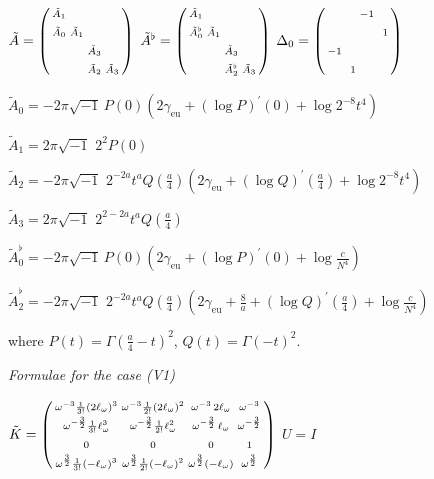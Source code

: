 \documentclass[a4paper,12pt,leqno]{amsart}
\numberwithin{equation}{section}
\theoremstyle{plain}
\theoremstyle{definition}
\newcommand{\De}{\Delta}
\newcommand{\om}{\omega}
\newcommand{\Ga}{\Gamma}
\newcommand{\no}{\noindent}
\newcommand{\pr}{\prime}
\newcommand{\bsp}{\left(\begin{smallmatrix}}
\newcommand{\esp}{\end{smallmatrix}\right)}
\newcommand{\ii}{ {\scriptstyle\sqrt{-1}}\, }
\newcommand{\eo}{\ell_\om}
\newcommand{\euler}{\gamma_{\scriptscriptstyle\text{eu}}}
\begin{document}
{$
\tilde A=
\bsp
\vphantom\sph
\tilde A_1 & & & 
\\
\vphantom\sph
\tilde A_0 & \tilde A_1 & & 
\\
\vphantom\sph
 & & \tilde A_3  & 
 \\
 \vphantom\sph
 & & \tilde A_2  & \tilde A_3
\esp
$
\quad
$
\tilde A^\flat=
\bsp
\vphantom\sph
\tilde A_1 & & & 
\\
\vphantom\sph
\tilde A^\flat_0 & \tilde A_1 & & 
\\
\vphantom\sph
 & & \tilde A_3  & 
 \\
 \vphantom\sph
 & & \tilde A^\flat_2  & \tilde A_3
\esp
$
\quad
$
\De_0=
\bsp 
\vphantom\sph
 & & -1& \\
 \vphantom\sph
  & &  &\ 1 \\
  \vphantom\sph
 -1  &  & & \\
 \vphantom\sph
    & \ 1 & &
\esp
$

$\tilde A_0 =-2\pi\ii  
P(0)  \left(
2\euler  + (\log P)^\pr(0) +   \log 2^{-8}t^4  
\right)$

$\tilde A_1 = 2\pi\ii \, 2^2 P(0)$

$\tilde A_2 = -2\pi\ii \, 2^{-2a} t^{a} 
Q(\tfrac a4)\left(
2\euler  + (\log Q)^\pr(\tfrac a4) +   \log 2^{-8}t^4  
\right)$

$\tilde A_3 = 2\pi\ii \, 2^{2-2a} t^a Q(\tfrac a4)$

\smallskip

$\tilde A^\flat_0 =-2\pi\ii  
P(0)  \left(
2\euler  + (\log P)^\pr(0) +    \log \tfrac{c}{N^4}
\right)$

$\tilde A^\flat_2 = -2\pi\ii \, 2^{-2a} t^{a} 
Q(\tfrac a4)\left(
2\euler  + \tfrac 8a + (\log Q)^\pr(\tfrac a4) +    \log \tfrac{c}{N^4} 
\right)$

\no where $P(t)=\Ga(\tfrac a4-t)^2$, $Q(t)=\Ga(-t)^2$.


\begin{center}
{\em Formulae for the case (V1)} 
\end{center}

$
\tilde K= 
\bsp
\vphantom\sph
\om^{-3} \frac{1}{3!}  {(2\eo)^3}
& \om^{-3} \frac{1}{2!}   {(2\eo)^2}
& \om^{-3} \, 2\eo  &\om^{-3}
\\
\vphantom\sph
\om^{-\frac32} \frac{1}{3!}  {\eo^3}
& \om^{-\frac32} \frac{1}{2!}  {\eo^2} & \om^{-\frac32} \,\eo  &\om^{-\frac32}
\\
\vphantom\sph
0 & 0 & 0 & 1
\\
\vphantom\sph
\om^{\frac32} \frac{1}{3!}  {(-\eo)^3} & \om^{\frac32} \frac{1}{2!}  {(-\eo)^2} & \om^{\frac32} (-\eo)  &\om^{\frac32}
\esp
$
\quad
$U=I$

}
\end{document}
